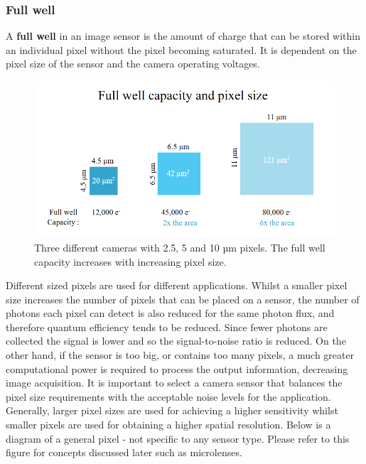 \documentclass[10pt]{article}
\begin{document}
\begin{multicols}{2}
\subsubsection{Full well}
A \textbf{full well} in an image sensor is the amount of charge that can be stored within an individual pixel without the pixel becoming saturated. It is dependent on the pixel size of the sensor and the camera operating voltages.
\begin{figure}[H]
    \centering
    \includegraphics[width=1\linewidth]{Images/Week 2/full-well.png}
    \caption{Three different cameras with 2.5, 5 and 10 µm pixels. The full well capacity increases with increasing pixel size.}
\end{figure}
Different sized pixels are used for different applications. Whilst a smaller pixel size increases the number of pixels that can be placed on a sensor, the number of photons each pixel can detect is also reduced for the same photon flux, and therefore quantum efficiency tends to be reduced. Since fewer photons are collected the signal is lower and so the signal-to-noise ratio is reduced.
On the other hand, if the sensor is too big, or contains too many pixels, a much greater computational power is required to process the output information, decreasing image acquisition. It is important to select a camera sensor that balances the pixel size requirements with the acceptable noise levels for the application.
Generally, larger pixel sizes are used for achieving a higher sensitivity whilst smaller pixels are used for obtaining a higher spatial resolution.
\newline \newline
Below is a diagram of a general pixel - not specific to any sensor type. Please refer to this figure for concepts discussed later such as microlenses.
\begin{figure}[H]
    \centering

\end{figure}
\end{multicols}
\end{document}

